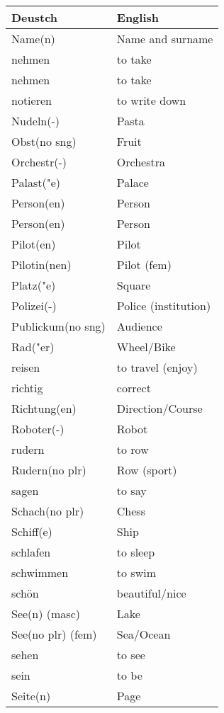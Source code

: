 \documentclass{article}
\renewcommand{\arraystretch}{1}
\begin{document}
\newpage

\begin{minipage}{0.48\textwidth}
    \centering
    \renewcommand{\arraystretch}{1.5}
    \begin{tabular}{|>{\raggedright\arraybackslash}p{3.5cm}|>{\raggedright\arraybackslash}p{3.5cm}|}
        \hline
        \rowcolor{gray!20} \textbf{Deustch} & \textbf{English} \\
        \hline
        Name(n) & Name and surname \\\hline
        nehmen &  to take \\\hline
        nehmen & to take \\\hline
        notieren & to write down \\\hline
        Nudeln(-) & Pasta \\\hline
        Obst(no sng) & Fruit \\\hline
        Orchestr(-) & Orchestra \\\hline
        Palast("e) & Palace \\\hline
        Person(en) & Person \\\hline
        Person(en) & Person \\\hline
        Pilot(en) & Pilot \\\hline
        Pilotin(nen) & Pilot (fem) \\\hline
        Platz("e) & Square \\\hline
        Polizei(-) & Police (institution) \\\hline
        Publickum(no sng) & Audience \\\hline
        Rad("er) & Wheel/Bike \\\hline
        reisen & to travel (enjoy) \\\hline
        richtig & correct \\\hline
        Richtung(en) & Direction/Course \\\hline
        Roboter(-) & Robot \\\hline
        rudern & to row \\\hline
        Rudern(no plr) & Row (sport) \\\hline
        sagen & to say \\\hline
        Schach(no plr) & Chess \\\hline
        Schiff(e) & Ship \\\hline
        schlafen & to sleep \\\hline
        schwimmen & to swim \\\hline
        schön & beautiful/nice \\\hline
        See(n) (masc) & Lake \\\hline
        See(no plr) (fem) & Sea/Ocean \\\hline
        sehen & to see \\\hline
        sein & to be \\\hline
        Seite(n) & Page \\\hline
    \end{tabular}
\end{minipage}%
\end{document}
